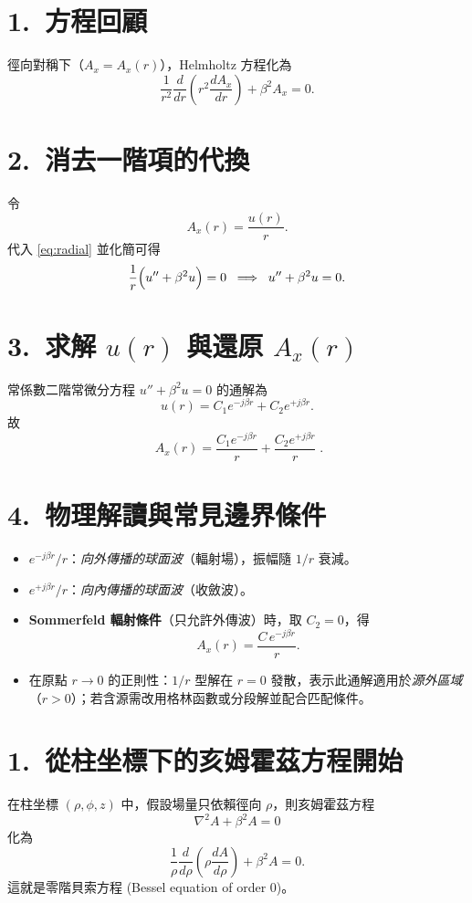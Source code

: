 \documentclass{article}
\begin{document}
\section*{1.~方程回顧}
徑向對稱下（$A_x=A_x(r)$），Helmholtz 方程化為
\begin{equation}
\frac{1}{r^2}\frac{d}{dr}\!\left(r^2 \frac{dA_x}{dr}\right)+\beta^2 A_x=0.
\label{eq:radial}
\end{equation}

\section*{2.~消去一階項的代換}
令
\[
A_x(r)=\frac{u(r)}{r}.
\]
代入 \eqref{eq:radial} 並化簡可得
\[
\frac{1}{r}\Bigl(u''+\beta^2 u\Bigr)=0
\;\;\Longrightarrow\;\;
u''+\beta^2 u=0.
\]

\section*{3.~求解 $u(r)$ 與還原 $A_x(r)$}
常係數二階常微分方程
\(
u''+\beta^2 u=0
\)
的通解為
\[
u(r)=C_1 e^{-j\beta r}+C_2 e^{+j\beta r}.
\]
故
\[
\boxed{\;
A_x(r)=\frac{C_1 e^{-j\beta r}}{r}+\frac{C_2 e^{+j\beta r}}{r}\;}.
\]

\section*{4.~物理解讀與常見邊界條件}
\begin{itemize}
  \item $e^{-j\beta r}/r$：\emph{向外傳播的球面波}（輻射場），振幅隨 $1/r$ 衰減。
  \item $e^{+j\beta r}/r$：\emph{向內傳播的球面波}（收斂波）。
  \item \textbf{Sommerfeld 輻射條件}（只允許外傳波）時，取 $C_2=0$，得
  \[
  A_x(r)=\frac{C\,e^{-j\beta r}}{r}.
  \]
  \item 在原點 $r\to 0$ 的正則性：$1/r$ 型解在 $r=0$ 發散，表示此通解適用於\emph{源外區域}（$r>0$）；若含源需改用格林函數或分段解並配合匹配條件。
\end{itemize}
\section*{1.~從柱坐標下的亥姆霍茲方程開始}
在柱坐標 $(\rho,\phi,z)$ 中，假設場量只依賴徑向 $\rho$，則亥姆霍茲方程
\[
\nabla^2 A + \beta^2 A = 0
\]
化為
\[
\frac{1}{\rho}\frac{d}{d\rho}\!\left(\rho \frac{dA}{d\rho}\right) + \beta^2 A = 0.
\]
這就是零階貝索方程 (Bessel equation of order 0)。
\end{document}

